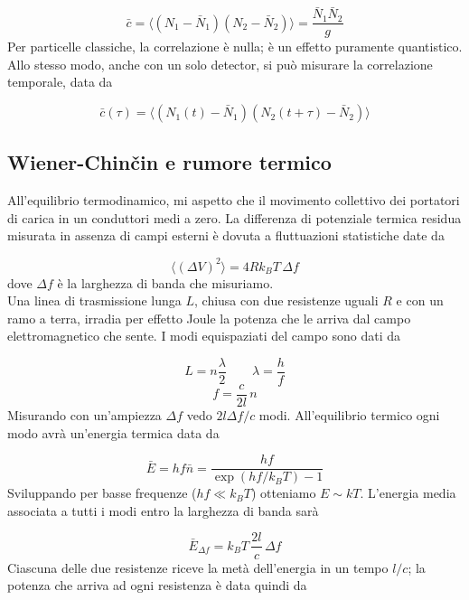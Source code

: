 \documentclass[a4paper]{report}
\begin{document}
\begin{equation}
    \bar{c} = \langle(N_1-\bar{N}_1) (N_2-\bar{N}_2)\rangle = \frac{\bar{N}_1\bar{N}_2}{g}
\end{equation}
Per particelle classiche, la correlazione è nulla; è un effetto puramente quantistico. Allo stesso modo, anche con un solo detector, si può misurare la correlazione temporale, data da

\begin{equation}
    \bar{c}(\tau) = \langle (N_1(t)-\bar{N}_1)(N_2(t+\tau)- \bar{N}_2 ) \rangle
\end{equation}

\subsection{Wiener-Chin\v{c}in e rumore termico}

All'equilibrio termodinamico, mi aspetto che il movimento collettivo dei portatori di carica in un conduttori medi a zero. La differenza di potenziale termica residua misurata in assenza di campi esterni è dovuta a fluttuazioni statistiche date da

\begin{equation}
    \langle(\Delta V)^2\rangle = 4 R k_B T \,\Delta f
    \label{rumore johnson}
\end{equation}
dove $\Delta f$ è la larghezza di banda che misuriamo. \\
Una linea di trasmissione lunga $L$, chiusa con due resistenze uguali $R$ e con un ramo a terra, irradia per effetto Joule la potenza che le arriva dal campo elettromagnetico che sente. I modi equispaziati del campo sono dati da 

\begin{equation}
    L = n \frac{\lambda}{2}\qquad \lambda = \frac{h}{f}
\end{equation}
\begin{equation}
    f = \frac{c}{2l}\,n
\end{equation}
Misurando con un'ampiezza $\Delta f$ vedo $2 l \Delta f/c $ modi. All'equilibrio termico ogni modo avrà un'energia termica data da 

\begin{equation}
    \bar{E} = h f \bar{n} = \frac{h f}{\exp(h f/k_B T)-1}
\end{equation}
Sviluppando per basse frequenze ($h f \ll k_B T$) otteniamo $E \sim k T$. L'energia media associata a tutti i modi entro la larghezza di banda sarà

\begin{equation}
    \bar{E}_{\Delta f} = k_B T \,\frac{2l}{c}\,\Delta f
\end{equation}
Ciascuna delle due resistenze riceve la metà dell'energia in un tempo $l/c$; la potenza che arriva ad ogni resistenza è data quindi da
\end{document}
